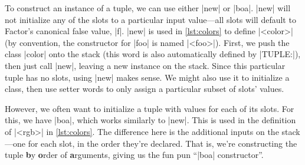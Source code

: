 To construct an instance of a tuple, we can use either \factor|new| or
\factor|boa|.  \factor|new| will not initialize any of the slots to a
particular input value---all slots will default to Factor's canonical false
value, \factor|f|.  \factor|new| is used in \vref{lst:colors} to define
\factor|<color>| (by convention, the constructor for \factor|foo| is named
\factor|<foo>|).  First, we push the class \factor|color| onto the stack (this
word is also automatically defined by \factor|TUPLE:|), then just call
\factor|new|, leaving a new instance on the stack.  Since this particular tuple
has no slots, using \factor|new| makes sense.  We might also use it to
initialize a class, then use setter words to only assign a particular subset of
slots' values.

However, we often want to initialize a tuple with values for each of its slots.
For this, we have \factor|boa|, which works similarly to \factor|new|.  This is
used in the definition of \factor|<rgb>| in \vref{lst:colors}.  The difference
here is the additional inputs on the stack---one for each slot, in the order
they're declared.  That is, we're constructing the tuple \textbf{b}y
\textbf{o}rder of \textbf{a}rguments, giving us the fun pun ``\factor|boa|
constructor''.


